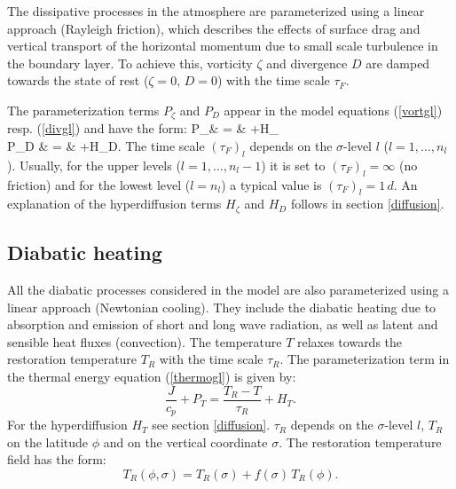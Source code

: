 The dissipative processes in the atmosphere are parameterized using a linear 
approach (Rayleigh friction), which describes the effects of surface drag and 
vertical transport of the horizontal momentum due to small scale turbulence 
in the boundary layer. To achieve this, vorticity $\zeta$ and divergence $D$ 
are damped towards the state of rest ($\zeta=0,\,D=0$) with the time scale $\tau_F$.

The parameterization terms $P_\zeta$ and $P_D$ appear in the model equations 
(\ref{vortgl}) resp. (\ref{divgl}) and have the form:
\beqa
P_\zeta & = & +H_\zeta \label{paraz} \\
P_D & = & +H_D. \label{parad}
\eeqa
The time scale $(\tau_F)_l$ depends on the $\sigma$-level $l$ ($l=1,\ldots,n_l$). 
Usually, for the upper levels ($l=1,\ldots,n_l-1$) it is set to 
$(\tau_F)_l=\infty$ (no friction) and for the lowest level ($l=n_l$) 
a typical value is $(\tau_F)_l=1\,d$. An explanation of the hyperdiffusion terms 
$H_\zeta$ and $H_D$ follows in section \ref{diffusion}.

\subsection{Diabatic heating}
\label{diabatischeheizung}

All the diabatic processes considered in the model are also parameterized using 
a linear approach (Newtonian cooling). They include the diabatic heating due to 
absorption and emission of short and long wave radiation, as well as latent and 
sensible heat fluxes (convection). The temperature $T$ relaxes towards the 
restoration temperature $T_R$ with the time scale $\tau_R$. The parameterization 
term in the thermal energy equation (\ref{thermogl}) is given by:
\begin{equation}
\frac{J}{c_p}+P_T = \frac{T_R-T}{\tau_R}+H_T. \label{parat}
\end{equation}
For the hyperdiffusion $H_T$ see section \ref{diffusion}. $\tau_R$ depends on 
the $\sigma$-level $l$, $T_R$ on the latitude $\phi$ and on the vertical 
coordinate $\sigma$. The restoration temperature field has the form:
\begin{equation}
\label{glgTr_2d}
T_R(\phi,\sigma) = T_R(\sigma)+f(\sigma)\,T_R(\phi).
\end{equation}

